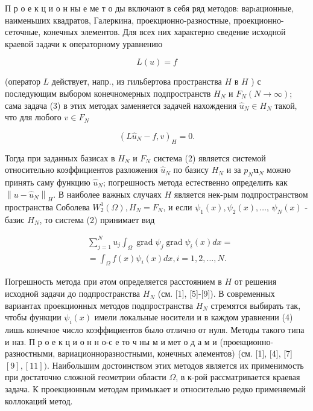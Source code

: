 \documentclass[10pt]{article}
\begin{document}
П р о е к ц и о н ны е ме т о ды включают в себя ряд методов: варıационные, наименьших квадратов, Галеркина, проекционно-разностные, проекционно-сеточные, конечных элементов. Для всех них характерно сведение исходной краевой задачи к операторному уравнению



\[

L(u)=f

\]



(оператор $L$ действует, напр., из гильбертова пространства $H$ в $H$ ) с последующим выбором конечномерных подпространств $H_{N}$ и $F_{N}(N \rightarrow \infty)$; сама задача (3) в этих методах заменяется задачей нахождения $\widehat{u}_{N} \in H_{N}$ такой, что для любого $v \in F_{N}$



\[

\left(L \hat{u}_{N}-f, v\right)_{H}=0 .

\]



Тогда при заданных базисах в $H_{N}$ и $F_{N}$ система (2) является системой относительно коэффициентов разложения $\hat{u}_{N}$ по базису $H_{N}$ и за $p_{N} \boldsymbol{u}_{N}$ можно принять саму функцию $\hat{u}_{N}$; погрешность метода естественно определить как $\left\|u-\hat{u}_{N}\right\|_{H}$. В наиболее важных случаях $H$ является нек-рым подпространством пространства Соболева $W_{2}^{1}(\Omega), H_{N}=F_{N}$, и если $\psi_{1}(x), \psi_{2}(x), \ldots$, $\psi_{N}(x)$ - базис $H_{N}$, то система (2) принимает вид



\[

\begin{aligned}

& \sum_{j=1}^{N} u_{j} \int_{\Omega} \operatorname{grad} \psi_{j} \operatorname{grad} \psi_{i}(x) d x= \\

& =\int_{\Omega} f(x) \psi_{i}(x) d x, i=1,2, \ldots, N .

\end{aligned}

\]



Погрешность метода при әтом определяется расстоянием в $H$ от решения исходной задачи до подпространства $H_{N}$ (см. [1], [5]-[9]). В современных вариантах проекционных методов подпространства $H_{N}$ стремятся выбирать так, чтобы функции $\psi_{i}(x)$ имели локальные носители и в каждом уравнении (4) лишь конечное число коэффициентов было отлично от нуля. Методы такого типа и наз. П р о е к ц и о н н о-с е то ч ны м и мет о д а м и (проекционно-разностными, вариационноразностными, конечных әлементов) (см. [1], [4], [7]$[9],[11])$. Наибольшим достоинством этих методов является их применимость при достаточно сложной геометрии области $\Omega$, в к-рой рассматривается краевая задача. К проекционным методам примыкает и относительно редко применяемый коллокаций метод.
\end{document}
